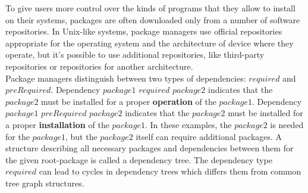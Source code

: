 To give users more control over the kinds of programs that they allow to install on their systems, packages are often downloaded only from a number of software repositories.
In Unix-like systems, package managers use official repositories appropriate for the operating system and the architecture  of device where they operate, but it's possible to use additional repositories, like third-party repositories or repositories for another architecture.\\
Package managers distinguish between two types of dependencies: $required$ and $preRequired$. %
Dependency $package1$ \textbf{$required$} $package2$ indicates that the $package2$ must be installed for a proper \textbf{operation} of the $package1$. %
Dependency $package1$ \textbf{$preRequired$} $package2$ indicates that the $package2$ must be installed for a proper \textbf{installation} of the $package1$. %
In these examples, the $package2$ is needed for the $package1$, but the $package2$ itself can require additional packages.
A structure describing all necessary packages and dependencies between them for the given root-package is called a dependency tree. 
The dependency type $required$ can lead to cycles in dependency trees which differs them from common tree graph structures.
